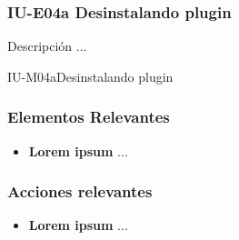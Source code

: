 
\subsubsection{IU-E04a Desinstalando plugin}

 Descripción ...

        {IU-M04a}{Desinstalando plugin}

\subsubsection{Elementos Relevantes}

    \begin{itemize}
    \item {\bf Lorem ipsum}
        ...
    \end{itemize}

\subsubsection{Acciones relevantes}

    \begin{itemize}
    \item {\bf Lorem ipsum}
        ...
    \end{itemize}

\clearpage

